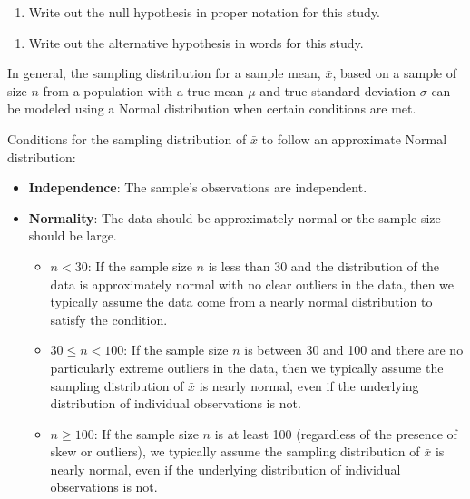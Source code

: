 \documentclass[
]{report}
\providecommand{\tightlist}{%
  \setlength{\itemsep}{0pt}\setlength{\parskip}{0pt}}
\begin{document}
\begin{enumerate}
\def\labelenumi{\arabic{enumi}.}
\tightlist
\item
  Write out the null hypothesis in proper notation for this study.
\end{enumerate}

\vspace{0.8in}

\begin{enumerate}
\def\labelenumi{\arabic{enumi}.}
\setcounter{enumi}{1}
\tightlist
\item
  Write out the alternative hypothesis in words for this study.
\end{enumerate}

\vspace{0.5in}

In general, the sampling distribution for a sample mean, \(\bar{x}\), based on a sample of size \(n\) from a population with a true mean \(\mu\) and true standard deviation \(\sigma\) can be modeled using a Normal distribution when certain conditions are met.

Conditions for the sampling distribution of \(\bar{x}\) to follow an approximate Normal distribution:

\begin{itemize}
\item
  \textbf{Independence}: The sample's observations are independent.
\item
  \textbf{Normality}: The data should be approximately normal or the sample size should be large.

  \begin{itemize}
  \item
    \(n < 30\): If the sample size \(n\) is less than 30 and the distribution of the data is approximately normal with no clear outliers in the data, then we typically assume the data come from a nearly normal distribution to satisfy the condition.
  \item
    \(30 \leq n < 100\): If the sample size \(n\) is between 30 and 100 and there are no particularly extreme outliers in the data, then we typically assume the sampling distribution of \(\bar{x}\) is nearly normal, even if the underlying distribution of individual observations is not.
  \item
    \(n \geq 100\): If the sample size \(n\) is at least 100 (regardless of the presence of skew or outliers), we typically assume the sampling distribution of \(\bar{x}\) is nearly normal, even if the underlying distribution of individual observations is not.
  \end{itemize}
\end{itemize}
\end{document}
